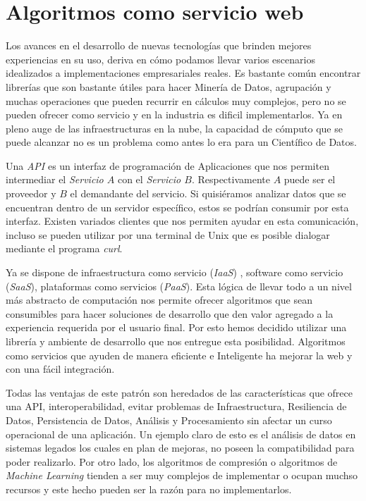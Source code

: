 \section{Algoritmos como servicio web }

	Los avances en el desarrollo de nuevas tecnologías que brinden mejores experiencias en su uso, deriva en cómo podamos llevar varios escenarios idealizados a implementaciones empresariales reales. Es bastante común encontrar librerías que son bastante útiles para hacer Minería de Datos, agrupación y muchas operaciones que pueden recurrir en cálculos muy complejos, pero no se pueden ofrecer como servicio y en la industria es dificil implementarlos. Ya en pleno auge de las infraestructuras en la nube, la capacidad de cómputo que se puede alcanzar no es un problema como antes lo era para un Científico de Datos.


	Una \emph{API} es un interfaz de programación de Aplicaciones que nos permiten intermediar el \emph{Servicio $A$} con el \emph{Servicio $B$}. Respectivamente $A$ puede ser el proveedor y $B$ el demandante del servicio. Si quisiéramos analizar datos que se encuentran dentro de un servidor específico, estos se podrían consumir por esta interfaz. Existen variados clientes que nos permiten ayudar en esta comunicación, incluso se pueden utilizar por una terminal de {Unix} que es posible dialogar mediante el programa \emph{curl}.
	
	Ya se dispone de infraestructura como servicio (\emph{IaaS}) , software como servicio (\emph{SaaS}), plataformas como servicios (\emph{PaaS}). Esta lógica de llevar todo a un nivel más abstracto de computación nos permite ofrecer  algoritmos que sean consumibles para hacer soluciones de desarrollo que den valor agregado a la experiencia requerida por el usuario final. Por esto hemos decidido utilizar una librería y ambiente de desarrollo que nos entregue esta posibilidad. Algoritmos como servicios que ayuden de manera eficiente e Inteligente ha mejorar la web y con una fácil integración. 
	
	Todas las ventajas de este patrón son heredados de las características que ofrece una {API}, interoperabilidad, evitar problemas de Infraestructura, Resiliencia de Datos, Persistencia de Datos, Análisis y Procesamiento sin afectar un curso operacional de una aplicación. Un ejemplo claro de esto es el análisis de datos en sistemas legados los cuales en plan de mejoras, no poseen la compatibilidad para poder realizarlo. Por otro lado, los algoritmos de compresión o algoritmos de \emph{Machine Learning} tienden a ser muy complejos de implementar o ocupan muchso recursos y este hecho pueden ser la razón para no implementarlos. 
	
	
	
	